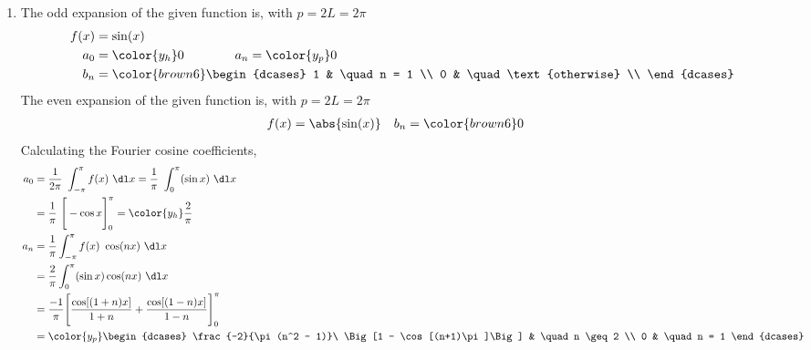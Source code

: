 \begin{enumerate}
    \item The odd expansion of the given function is, with $  p = 2L = 2\pi $
          \begin{align}
              f(x) & = \sin(x)                                   \\
              a_0  & = {\color{y_h} 0} \qquad\qquad
              a_n = {\color{y_p} 0}                              \\
              b_n  & = \color{brown6} \begin{dcases}
                                          1 & \quad n = 1            \\
                                          0 & \quad \text{otherwise} \\
                                      \end{dcases}
          \end{align}
          The even expansion of the given function is, with $  p = 2L = 2\pi $
          \begin{align}
              f(x) & = \abs{\sin(x)}    &
              b_n  & = \color{brown6} 0
          \end{align}
          Calculating the Fourier cosine coefficients,
          \begin{align}
              a_0 & = \frac{1}{2\pi}\ \int_{-\pi}^{\pi} f(x)\ \dl x
              = \frac{1}{\pi}\ \int_{0}^{\pi} (\sin x)\ \dl x               \\
                  & =  \frac{1}{\pi}\ \Bigg[ -\cos x \Bigg]_{0}^{\pi}
              = \color{y_h} \frac{2}{\pi}                                   \\
              a_n & = \frac{1}{\pi} \int_{-\pi}^{\pi} f(x)\ \cos(nx)\ \dl x \\
                  & = \frac{2}{\pi} \int_{0}^{\pi} (\sin x) \cos(nx)\ \dl x \\
                  & = \frac{-1}{\pi}\Bigg[ \frac{\cos[(1+n)x]}{1+n}
              + \frac{\cos[(1-n)x]}{1-n} \Bigg]_{0}^{\pi}                   \\
                  & = \color{y_p}
              \begin{dcases}
                  \frac{-2}{\pi (n^2 - 1)}\ \Big[1 - \cos[(n+1)\pi]\Big] &
                  \quad n \geq 2                                           \\
                  0                                                      &
                  \quad n = 1
              \end{dcases}
          \end{align}


\end{enumerate}
